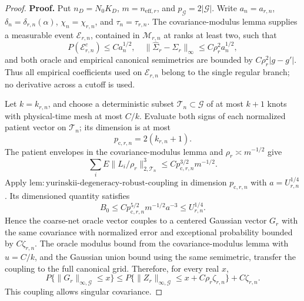 \documentclass{article}
\begin{document}
\begin{proof}
\textbf{Proof.}
Put \(n_D=N_0K_D\), \(m=n_{\mathrm{eff},r}\), and \(p_{\mathcal G}=2|\mathcal G|\).  Write \(a_n=a_{r,n}\), \(\delta_n=\delta_{r,n}(\alpha)\), \(\chi_n=\chi_{r,n}\), and \(\tau_n=\tau_{r,n}\).  The covariance-modulus lemma supplies a measurable event \(\mathcal E_{r,n}\), contained in \(\mathcal M_{r,n}\) at ranks at least two, such that
\[
 P(\mathcal E_{r,n}^c)\le Ca_n^{1/2},
 \quad
 \|\widehat\Sigma_r-\Sigma_r\|_\infty
 \le C\rho_r^2a_n^{1/2},                                \tag{1}
\]
and both oracle and empirical canonical semimetrics are bounded by
\(C\rho_r^2|g-g'|\).  Thus all empirical coefficients used on \(\mathcal E_{r,n}\) belong to the single regular branch; no derivative across a cutoff is used.

Let \(k=k_{r,n}\), and choose a deterministic subset \(\mathcal T_n\subset\mathcal G\) of at most \(k+1\) knots with physical-time mesh at most \(C/k\).  Evaluate both signs of each normalized patient vector on \(\mathcal T_n\); its dimension is at most
\[
 p_{\mathrm c,r,n}=2(k_{r,n}+1).                        \tag{2}
\]
The patient envelopes in the covariance-modulus lemma and \(\rho_r\asymp m^{-1/2}\) give
\[
 \sum_iE\|L_i/\rho_r\|_{2,\mathcal T_n}^3
 \le Cp_{\mathrm c,r,n}^{3/2}m^{-1/2}.                 \tag{3}
\]
Apply \(\mathrm{lem:yurinskii\mbox{-}degeneracy\mbox{-}robust\mbox{-}coupling}\) in dimension \(p_{\mathrm c,r,n}\) with \(a=U_{r,n}^{1/4}\).  Its dimensioned quantity satisfies
\[
 B_0\le Cp_{\mathrm c,r,n}^{5/2}m^{-1/2}a^{-3}
 \le U_{r,n}^{1/4}.                                     \tag{4}
\]
Hence the coarse-net oracle vector couples to a centered Gaussian vector \(G_r\) with the same covariance with normalized error and exceptional probability bounded by \(C\zeta_{r,n}\).  The oracle modulus bound from the covariance-modulus lemma with \(u=C/k\), and the Gaussian union bound using the same semimetric, transfer the coupling to the full canonical grid.  Therefore, for every real \(x\),
\[
 P\{\|G_r\|_{\infty,\mathcal G}\le x\}
 \le P\{\|Z_r\|_{\infty,\mathcal G}
 \le x+C\rho_r\zeta_{r,n}\}+C\zeta_{r,n}.             \tag{5}
\]
This coupling allows singular covariance.


\end{proof}
\end{document}
